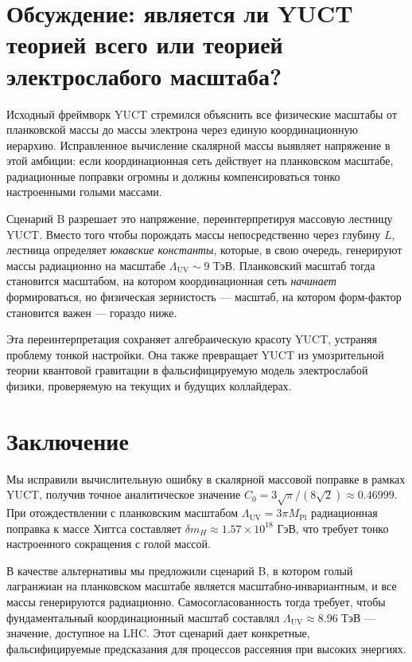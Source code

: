 \documentclass[11pt,a4paper]{article}
\newcommand{\Mpl}{M_{\mathrm{Pl}}}
\newcommand{\LUV}{\Lambda_{\mathrm{UV}}}
\theoremstyle{remark}
\begin{document}
	\section{Обсуждение: является ли YUCT теорией всего или теорией электрослабого масштаба?}
	\label{sec:discussion}
	
	Исходный фреймворк YUCT стремился объяснить все физические масштабы от планковской массы до массы электрона через единую координационную иерархию. Исправленное вычисление скалярной массы выявляет напряжение в этой амбиции: если координационная сеть действует на планковском масштабе, радиационные поправки огромны и должны компенсироваться тонко настроенными голыми массами.
	
	Сценарий B разрешает это напряжение, переинтерпретируя массовую лестницу YUCT. Вместо того чтобы порождать массы непосредственно через глубину \(L\), лестница определяет \emph{юкавские константы}, которые, в свою очередь, генерируют массы радиационно на масштабе \(\LUV \sim 9\) ТэВ. Планковский масштаб тогда становится масштабом, на котором координационная сеть \emph{начинает} формироваться, но физическая зернистость — масштаб, на котором форм-фактор становится важен — гораздо ниже.
	
	Эта переинтерпретация сохраняет алгебраическую красоту YUCT, устраняя проблему тонкой настройки. Она также превращает YUCT из умозрительной теории квантовой гравитации в фальсифицируемую модель электрослабой физики, проверяемую на текущих и будущих коллайдерах.
	
	\section{Заключение}
	\label{sec:conclusion}
	
	Мы исправили вычислительную ошибку в скалярной массовой поправке в рамках YUCT, получив точное аналитическое значение \(C_0 = 3\sqrt{\pi}/(8\sqrt{2}) \approx 0.46999\). При отождествлении с планковским масштабом \(\LUV = 3\pi\Mpl\) радиационная поправка к массе Хиггса составляет \(\delta m_H \approx 1.57\times 10^{18}\) ГэВ, что требует тонко настроенного сокращения с голой массой.
	
	В качестве альтернативы мы предложили сценарий B, в котором голый лагранжиан на планковском масштабе является масштабно-инвариантным, и все массы генерируются радиационно. Самосогласованность тогда требует, чтобы фундаментальный координационный масштаб составлял \(\LUV \approx 8.96\) ТэВ — значение, доступное на LHC. Этот сценарий дает конкретные, фальсифицируемые предсказания для процессов рассеяния при высоких энергиях.
	
\end{document}

